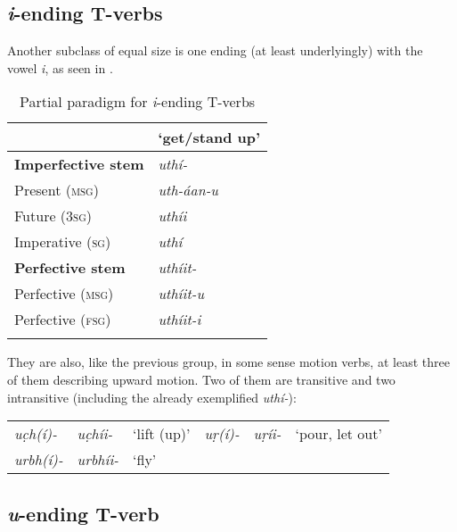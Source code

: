 \subsection{\textit{i}-ending T-verbs}
\label{subsec:8-3-9}


Another subclass of equal size is one ending (at least underlyingly) with the vowel \textit{i}, as seen in .


\begin{table}[ht]
\caption{Partial paradigm for \textit{i}-ending T-verbs}
\begin{tabularx}{.75\textwidth}{ Q Q }
\lsptoprule
&
\textbf{`get/stand up'}\\\hline
\textbf{Imperfective stem} &
\textit{uthí-} \\
Present (\textsc{msg}) &
\textit{uth-áan-u} \\
Future (\textsc{3sg}) &
\textit{uthíi} \\
Imperative (\textsc{sg}) &
\textit{uthí} \\
\textbf{Perfective stem} &
\textit{uthíit-} \\
Perfective (\textsc{msg}) &
\textit{uthíit-u} \\
Perfective (\textsc{fsg}) &
\textit{uthíit-i} \\\lspbottomrule
\end{tabularx}
\label{tab:8-11}
\end{table}


They are also, like the previous group, in some sense motion verbs, at least three of them describing upward motion. Two of them are transitive and two intransitive (including the already exemplified \textit{uthí-}):


\begin{table}[H]
\begin{tabularx}{\textwidth}{ Q Q Q Q Q l@{\hspace{20pt}} }

\textit{uc̣h(í)-} &
\textit{uc̣híi-} &
`lift (up)' &
\textit{uṛ(í)-} &
\textit{uṛíi-} &
`pour, let out'\\
\textit{urbh(í)-} &
\textit{urbhíi-} &
`fly' &
&
&
\\
\end{tabularx}
\end{table}

\subsection{\textit{u}-ending T-verb}
\label{subsec:8-3-10}


